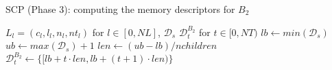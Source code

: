 \begin{algorithm}
  \caption{SCP (Phase 3): computing the memory descriptors for $B_2$}
  \label{alg:scp.phase3}
  \begin{algorithmic}[1]
    \REQUIRE $L_l = (c_l,l_l,n_l,nt_l)$ for $l \in [0, NL]$, $\mathcal{D}_s$
    \ENSURE $\mathcal{D}_t^{B_2}$ for $t \in [0, NT)$
    \STATE $lb \gets min(\mathcal{D}_s)$ \label{line:lb}
    \STATE $ub \gets max(\mathcal{D}_s)+1$ \label{line:ub}
    \STATE $len \gets (ub - lb) / nchildren$ \label{line:len}
     \label{line:thread.for}
    \STATE $\mathcal{D}_t^{B_2} \gets \lbrace [lb + t \cdot len, lb + (t+1) \cdot len) \rbrace$
    \ENDFOR \label{line:thread.forend}
  \end{algorithmic}
\end{algorithm}

